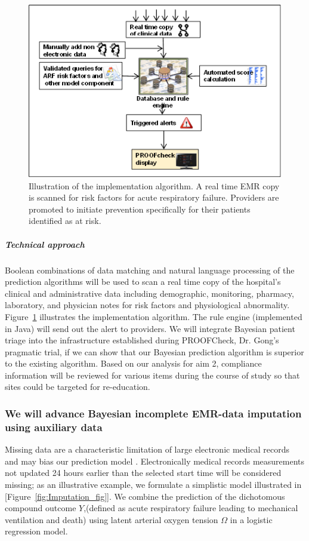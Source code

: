 \documentclass[11pt,notitlepage]{article}
\begin{document}
\begin{figure} 
 \vspace{-10pt}
 \includegraphics[scale=0.55]{Figures/Alert_trigger_fig.png} 
  \caption{\footnotesize Illustration of the implementation algorithm. A real time EMR copy is scanned for risk factors for acute respiratory failure. Providers are promoted to initiate prevention specifically for their patients identified as at risk.}
  \label{fig:implementation}
\end{figure} 

\subparagraph*{Technical approach}
Boolean combinations of data matching and natural language processing of the prediction algorithms will be used to scan a real time copy of the hospital's clinical and administrative data including demographic, monitoring, pharmacy, laboratory, and physician notes for risk factors and physiological abnormality. Figure~\ref{fig:implementation} illustrates the implementation algorithm. The rule engine (implemented in Java) will send out the alert to providers.
We will integrate Bayesian patient triage into the infrastructure established during PROOFCheck, Dr. Gong's pragmatic trial, if we can show that our Bayesian prediction algorithm is superior to the existing algorithm. Based on our analysis for aim 2, compliance information will be reviewed for various items during the course of study so that sites could be targeted for re-education.

\subsubsection*{We will advance Bayesian incomplete EMR-data imputation using auxiliary data}
Missing data are a characteristic limitation of large electronic medical records and may bias our prediction model \cite{Dean_19279318}. Electronically medical records measurements not updated 24 hours earlier than the selected start time will be considered missing;  as an illustrative example, we formulate a simplistic model illustrated in [Figure~\ref{fig:Imputation_fig}]. We combine the prediction of the dichotomous compound outcome $Y$,(defined as acute respiratory failure leading to mechanical ventilation and death) using latent arterial oxygen tension $\Omega$ in a logistic regression model. 
\end{document}
